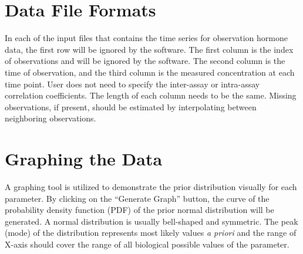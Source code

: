 \documentclass[11pt]{book}
\begin{document}
\section{Data File Formats}\label{intro:general}
In each of the input files that contains the time series for observation hormone data, the first row will be ignored by the software.
The first column is the index of observations and will be ignored by the software. The second column is the time of observation, and the third column is the measured concentration at each time point. User does not need to specify the inter-assay or intra-assay correlation coefficients. The length of each column needs to be the same.  Missing observations, if present, should be estimated by interpolating between neighboring observations.
\section{Graphing the Data}
A graphing tool is utilized to demonstrate the  prior distribution visually for each parameter. By clicking on the ``Generate Graph'' button, the curve of the probability density function (PDF) of the prior normal distribution will be generated. A normal distribution is usually bell-shaped and symmetric. The peak (mode) of the distribution represents most likely values \emph{a priori} and the range of X-axis should cover the range of all biological possible values of the parameter.
\end{document}
